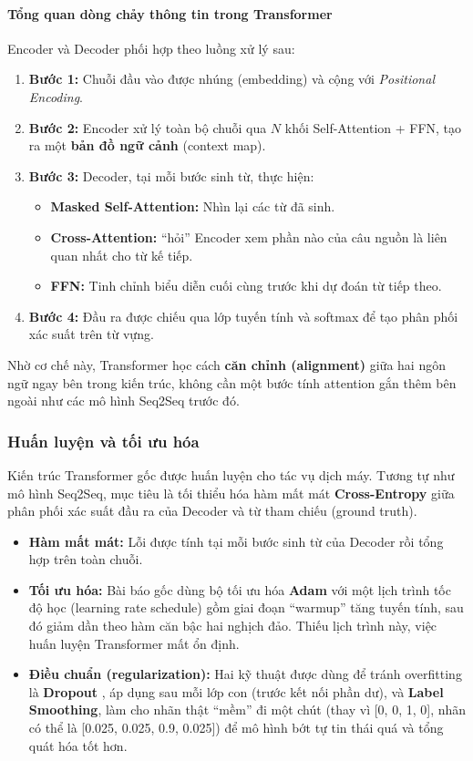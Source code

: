 \paragraph{Tổng quan dòng chảy thông tin trong Transformer}
Encoder và Decoder phối hợp theo luồng xử lý sau:
\begin{enumerate}
	\item \textbf{Bước 1:} Chuỗi đầu vào được nhúng (embedding) và cộng với \textit{Positional Encoding}.
	\item \textbf{Bước 2:} Encoder xử lý toàn bộ chuỗi qua $N$ khối Self-Attention + FFN, tạo ra một \textbf{bản đồ ngữ cảnh} (context map).
	\item \textbf{Bước 3:} Decoder, tại mỗi bước sinh từ, thực hiện:
	\begin{itemize}
		\item \textbf{Masked Self-Attention:} Nhìn lại các từ đã sinh.
		\item \textbf{Cross-Attention:} “hỏi” Encoder xem phần nào của câu nguồn là liên quan nhất cho từ kế tiếp.
		\item \textbf{FFN:} Tinh chỉnh biểu diễn cuối cùng trước khi dự đoán từ tiếp theo.
	\end{itemize}
	\item \textbf{Bước 4:} Đầu ra được chiếu qua lớp tuyến tính và softmax để tạo phân phối xác suất trên từ vựng.
\end{enumerate}

Nhờ cơ chế này, Transformer học cách \textbf{căn chỉnh (alignment)} giữa hai ngôn ngữ ngay bên trong kiến trúc, không cần một bước tính attention gắn thêm bên ngoài như các mô hình Seq2Seq trước đó.

\subsubsection{Huấn luyện và tối ưu hóa}
\label{sssec:transformer_training}
Kiến trúc Transformer gốc được huấn luyện cho tác vụ dịch máy. Tương tự như mô hình Seq2Seq, mục tiêu là tối thiểu hóa hàm mất mát \textbf{Cross-Entropy} giữa phân phối xác suất đầu ra của Decoder và từ tham chiếu (ground truth).

\begin{itemize}
    \item \textbf{Hàm mất mát:} Lỗi được tính tại mỗi bước sinh từ của Decoder rồi tổng hợp trên toàn chuỗi.
    \item \textbf{Tối ưu hóa:} Bài báo gốc dùng bộ tối ưu hóa \textbf{Adam} \cite{kingma2014adam} với một lịch trình tốc độ học (learning rate schedule) gồm giai đoạn “warmup” tăng tuyến tính, sau đó giảm dần theo hàm căn bậc hai nghịch đảo. Thiếu lịch trình này, việc huấn luyện Transformer mất ổn định.
    \item \textbf{Điều chuẩn (regularization):} Hai kỹ thuật được dùng để tránh overfitting là \textbf{Dropout} \cite{srivastava2014dropout}, áp dụng sau mỗi lớp con (trước kết nối phần dư), và \textbf{Label Smoothing}, làm cho nhãn thật “mềm” đi một chút (thay vì [0, 0, 1, 0], nhãn có thể là [0.025, 0.025, 0.9, 0.025]) để mô hình bớt tự tin thái quá và tổng quát hóa tốt hơn.
\end{itemize}


